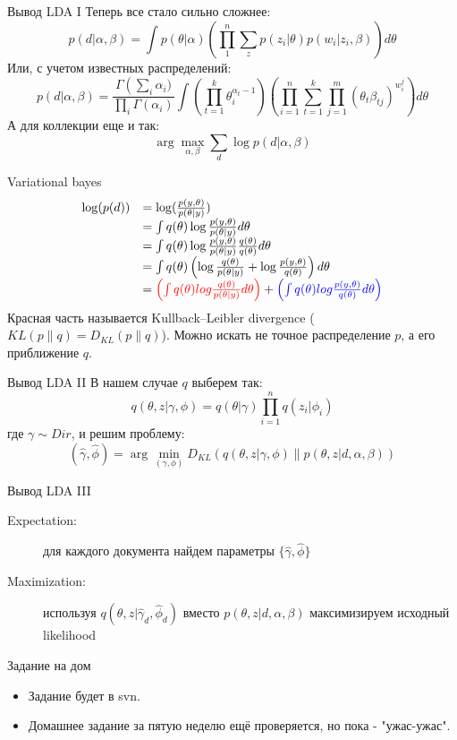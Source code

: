 \documentclass[14pt, fleqn, xcolor={dvipsnames, table}]{beamer}
\begin{document}
\begin{frame}{Вывод LDA I}
\small
Теперь все стало сильно сложнее:
$$
p(d|\alpha, \beta) = \int p(\theta | \alpha)\left(\prod_1^n\sum_{z}p(z_i|\theta)p(w_i|z_i,\beta)\right) d\theta
$$
Или, с учетом известных распределений:
$$
p(d|\alpha, \beta) = \frac{\Gamma\left(\sum_i\alpha_i)}{\prod_i \Gamma(\alpha_i)} \int \left(\prod_{t=1}^k \theta^{\alpha_t-1}_i\right)\left(\prod_{i=1}^n\sum_{t=1}^k\prod_{j=1}^m(\theta_t\beta_{tj})^{w_i^j}\right)d\theta
$$
А для коллекции еще и так:
$$
\arg \max_{\alpha, \beta} \sum_d \log p(d|\alpha, \beta)
$$
\end{frame}

\begin{frame}{Variational bayes}
$$\begin{array}{ll}
\log(p(d)) &= \log(\frac{p(y,\theta)}{p(\theta|y)}) \\
&= \int q(\theta) \log \frac{p(y,\theta)}{p(\theta|y)} d\theta \\
&= \int q(\theta) \log \frac{p(y,\theta)}{p(\theta|y)}\frac{q(\theta)}{q(\theta)} d\theta \\
&= \int q(\theta) \left(\log \frac{q(\theta)}{p(\theta|y)} + \log \frac{p(y,\theta)}{q(\theta)}\right) d\theta \\
&= {\color{red}\left(\int q(\theta) log \frac{q(\theta)}{p(\theta|y)}d\theta\right)} + {\color{blue}\left(\int q(\theta) log \frac{p(y,\theta)}{q(\theta)} d\theta\right)} \\
\end{array}$$
Красная часть называется Kullback–Leibler divergence ($KL(p\|q)=D_{KL}(p\|q)$). Можно искать не точное распределение $p$, а его приближение $q$.
\end{frame}

\begin{frame}{Вывод LDA II}
В нашем случае $q$ выберем так:
$$
q(\theta,z|\gamma,\phi) = q(\theta|\gamma) \prod_{i=1}^n q(z_i | \phi_i)
$$
где $\gamma \sim Dir$, и решим проблему:
$$
(\hat{\gamma},\hat{\phi}) = \arg \min_{(\gamma,\phi)} D_{KL}(q(\theta,z|\gamma,\phi)\|p(\theta, z|d,\alpha,\beta))
$$
\end{frame}

\begin{frame}{Вывод LDA III}
\begin{description}
  \item[Expectation:] для каждого документа найдем параметры $\{\hat{\gamma}, \hat{\phi}\}$
  \item[Maximization:] используя $q(\theta,z|\hat{\gamma}_d, \hat{\phi}_d)$ вместо $p(\theta,z|d,\alpha, \beta)$ максимизируем исходный likelihood
\end{description}
\end{frame}

\begin{frame}{Задание на дом}
\begin{itemize}
  \item Задание будет в svn.
  \item Домашнее задание за пятую неделю ещё проверяется, но пока - "ужас-ужас".
\end{itemize}
\end{frame}
\end{document}
